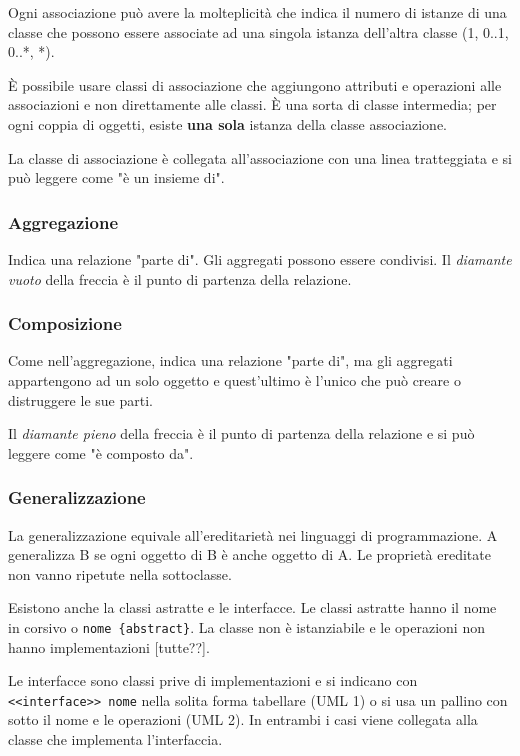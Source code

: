 Ogni associazione può avere la molteplicità che indica il numero di istanze di una classe che possono essere associate ad una singola istanza dell'altra classe (1, 0..1, 0..*, *).

\`E possibile usare classi di associazione che aggiungono attributi e operazioni alle associazioni e non direttamente alle classi. 
\`E una sorta di classe intermedia; per ogni coppia di oggetti, esiste \textbf{una sola} istanza della classe associazione. 

La classe di associazione è collegata all'associazione con una linea tratteggiata e si può leggere come "è un insieme di".

\subsubsection{Aggregazione}
Indica una relazione "parte di". Gli aggregati possono essere condivisi. Il \textit{diamante vuoto} della freccia è il punto di partenza della relazione.

\subsubsection{Composizione}
Come nell'aggregazione, indica una relazione "parte di", ma gli aggregati appartengono ad un solo oggetto e quest'ultimo è l'unico che può creare o distruggere le sue parti. 

Il \textit{diamante pieno} della freccia è il punto di partenza della relazione e si può leggere come "è composto da".

\subsubsection{Generalizzazione}
La generalizzazione equivale all'ereditarietà nei linguaggi di programmazione. 
A generalizza B se ogni oggetto di B è anche oggetto di A. Le proprietà ereditate non vanno ripetute nella sottoclasse.

Esistono anche la classi astratte e le interfacce. Le classi astratte hanno il nome in corsivo o \texttt{nome \{abstract\}}. La classe non è istanziabile  e le operazioni non hanno implementazioni [tutte??]. 

Le interfacce sono classi prive di implementazioni e si indicano con \texttt{<<interface>> nome} nella solita forma tabellare (UML 1) o si usa un pallino con sotto il nome e le operazioni (UML 2). 
In entrambi i casi viene collegata alla classe che implementa l'interfaccia.

